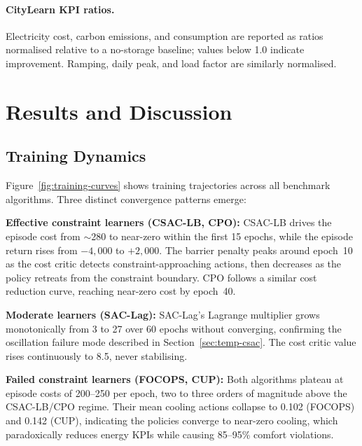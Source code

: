 \paragraph{CityLearn KPI ratios.}
Electricity cost, carbon emissions, and consumption are reported as ratios
normalised relative to a no-storage baseline; values below 1.0 indicate
improvement.  Ramping, daily peak, and load factor are similarly normalised.


\section{Results and Discussion}
\label{sec:temp-results}

\subsection{Training Dynamics}
\label{sec:temp-results-training}

Figure~\ref{fig:training-curves} shows training trajectories across all
benchmark algorithms.  Three distinct convergence patterns emerge:

\textbf{Effective constraint learners (CSAC-LB, CPO):}  CSAC-LB drives the
episode cost from $\sim$280 to near-zero within the first 15 epochs, while the
episode return rises from $-4{,}000$ to $+2{,}000$.  The barrier penalty peaks
around epoch~10 as the cost critic detects constraint-approaching actions, then
decreases as the policy retreats from the constraint boundary.  CPO follows a
similar cost reduction curve, reaching near-zero cost by epoch~40.

\textbf{Moderate learners (SAC-Lag):}  SAC-Lag's Lagrange multiplier grows
monotonically from 3 to 27 over 60 epochs without converging, confirming the
oscillation failure mode described in Section~\ref{sec:temp-csac}.  The cost
critic value rises continuously to 8.5, never stabilising.

\textbf{Failed constraint learners (FOCOPS, CUP):}  Both algorithms plateau
at episode costs of 200--250 per epoch, two to three orders of magnitude above
the CSAC-LB/CPO regime.  Their mean cooling actions collapse to 0.102 (FOCOPS)
and 0.142 (CUP), indicating the policies converge to near-zero cooling, which
paradoxically reduces energy KPIs while causing 85--95\% comfort violations.

